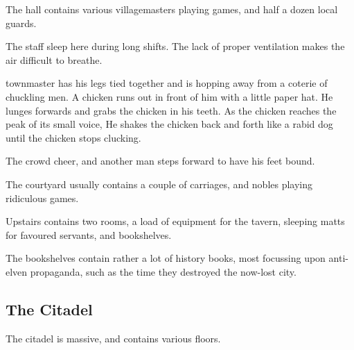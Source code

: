 The hall contains various villagemasters playing games, and half a dozen local guards.


The staff sleep here during long shifts.  The lack of proper ventilation makes the air difficult to breathe.


\begin{boxtext}

	\Gls{townmaster} has his legs tied together and is hopping away from a coterie of chuckling men.  A chicken runs out in front of him with a little paper hat.  He lunges forwards and grabs the chicken in his teeth.  As the chicken reaches the peak of its small voice, He shakes the chicken back and forth like a rabid dog until the chicken stops clucking.

	The crowd cheer, and another man steps forward to have his feet bound.

\end{boxtext}

The courtyard usually contains a couple of carriages, and nobles playing ridiculous games.


Upstairs contains two rooms, a load of equipment for the tavern, sleeping matts for favoured servants, and bookshelves.

The bookshelves contain rather a lot of history books, most focussing upon anti-elven propaganda, such as the time they destroyed the now-lost city.
 

\subsection{The Citadel}\label{citadel}
The citadel is massive, and contains various floors.

